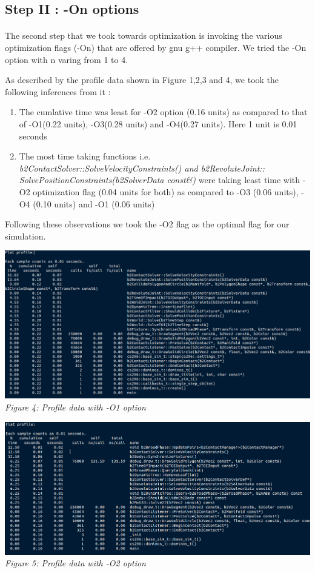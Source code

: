 \documentclass[11pt]{article}
\begin{document}
\subsection{Step II : -On options}
\paragraph{}
The second step that we took towards optimization is invoking the various optimization flags (-On) that are offered by gnu g++ compiler. 
We tried the -On option with n varing from 1 to 4.

	As described by the profile data shown in Figure 1,2,3 and 4, we took the following inferences from it :
	\begin{enumerate}
	\item{The cumlative time was least for -O2 option (0.16 units) as compared to that of -O1(0.22 units), -O3(0.28 units) and -O4(0.27 units). 		Here 1 unit is 0.01 seconds}
	\item{The most time taking functions i.e. \textit{b2ContactSolver::SolveVelocityConstraints() and b2RevoluteJoint:: SolvePositionConstraints(b2SolverData const\&)} were taking least time with -O2 optimization flag (0.04 units for both) as compared to -O3 (0.06 units), -O4 (0.10 units) and -O1 (0.06 units)}
	\end{enumerate}
	
	Following these observations we took the -O2 flag as the optimal flag for our simulation.
\begin{center}
 \includegraphics[scale = 0.35]{images/o1} \\
  \emph{Figure 4: Profile data with -O1 option} \\
\end{center}

\begin{center}
 \includegraphics[scale = 0.35]{images/o2} \\
  \emph{Figure 5: Profile data with -O2 option} \\
\end{center}
\end{document}
